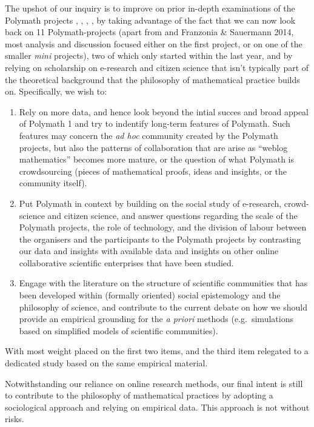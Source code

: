 \documentclass[article, floatfix, groupaddress, prb]{revtex4-1}
\begin{document}
The upshot of our inquiry is to improve on prior in-depth examinations
of the Polymath projects \cite{763884/BQAZU5GI}, \cite{763884/9KE9SA9C},
\cite{763884/BBVPZ6NT}, \cite{763884/HM3CT69N}, \cite{763884/RXTHUZGM}
by taking advantage of the fact that we can now look back on 11
Polymath-projects (apart from \cite{Ball2014} and Franzonia \& Sauermann
2014, most analysis and discussion focused either on the first project,
or on one of the smaller \emph{mini} projects), two of which only
started within the last year, and by relying on scholarship on
e-research and citizen science that isn't typically part of the
theoretical background that the philosophy of mathematical practice
builds on. Specifically, we wish to:

\begin{enumerate}
\def\labelenumi{\arabic{enumi}.}
\item
  Rely on more data, and hence look beyond the intial succes and broad
  appeal of Polymath 1 and try to indentify long-term features of
  Polymath. Such features may concern the \emph{ad hoc} community
  created by the Polymath projects, but also the patterns of
  collaboration that are arise as ``weblog mathematics'' becomes more
  mature, or the question of what Polymath is crowdsourcing (pieces of
  mathematical proofs, ideas and insights, or the community itself).
\item
  Put Polymath in context by building on the social study of e-research,
  crowd-science and citizen science, and answer questions regarding the
  scale of the Polymath projects, the role of technology, and the
  division of labour between the organisers and the participants to the
  Polymath projects by contrasting our data and insights with available
  data and insights on other online collaborative scientific enterprises
  that have been studied.
\item
  Engage with the literature on the structure of scientific communities
  that has been developed within (formally oriented) social epistemology
  and the philosophy of science, and contribute to the current debate on
  how we should provide an empirical grounding for the \emph{a priori}
  methods (e.g.~simulations based on simplified models of scientific
  communities).
\end{enumerate}

With most weight placed on the first two items, and the third item
relegated to a dedicated study based on the same empirical material.

    Notwithstanding our reliance on online research methods, our final
intent is still to contribute to the philosophy of mathematical
practices by adopting a sociological approach and relying on empirical
data. This approach is not without risks.
\end{document}
